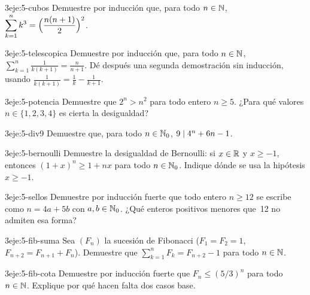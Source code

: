 \begin{ejercicio}{3}{eje:5-cubos}
Demuestre por inducción que, para todo $n\in\mathbb{N}$, $\displaystyle\sum_{k=1}^{n}k^{3}=\Bigl(\frac{n(n+1)}{2}\Bigr)^{2}$.
\end{ejercicio}

\begin{ejercicio}{3}{eje:5-telescopica}
Demuestre por inducción que, para todo $n\in\mathbb{N}$, $\displaystyle\sum_{k=1}^{n}\frac{1}{k(k+1)}=\frac{n}{n+1}$. Dé después una segunda demostración sin inducción, usando $\frac{1}{k(k+1)}=\frac1k-\frac1{k+1}$.
\end{ejercicio}

\begin{ejercicio}{3}{eje:5-potencia}
Demuestre que $2^{n}>n^{2}$ para todo entero $n\ge 5$. ¿Para qué valores $n\in\{1,2,3,4\}$ es cierta la desigualdad?
\end{ejercicio}

\begin{ejercicio}{3}{eje:5-div9}
Demuestre que, para todo $n\in\mathbb{N}_0$, $9\mid 4^{n}+6n-1$.
\end{ejercicio}

\begin{ejercicio}{3}{eje:5-bernoulli}
Demuestre la desigualdad de Bernoulli: si $x\in\mathbb{R}$ y $x\ge -1$, entonces $(1+x)^{n}\ge 1+nx$ para todo $n\in\mathbb{N}_0$. Indique dónde se usa la hipótesis $x\ge -1$.
\end{ejercicio}

\begin{ejercicio}{3}{eje:5-sellos}
Demuestre por inducción fuerte que todo entero $n\ge 12$ se escribe como $n=4a+5b$ con $a,b\in\mathbb{N}_0$. ¿Qué enteros positivos menores que~12 no admiten esa forma?
\end{ejercicio}

\begin{ejercicio}{3}{eje:5-fib-suma}
Sea $(F_n)$ la sucesión de Fibonacci ($F_1=F_2=1$, $F_{n+2}=F_{n+1}+F_n$). Demuestre que $\sum_{k=1}^{n}F_k=F_{n+2}-1$ para todo $n\in\mathbb{N}$.
\end{ejercicio}

\begin{ejercicio}{3}{eje:5-fib-cota}
Demuestre por inducción fuerte que $F_n\le(5/3)^{n}$ para todo $n\in\mathbb{N}$. Explique por qué hacen falta dos casos base.
\end{ejercicio}

